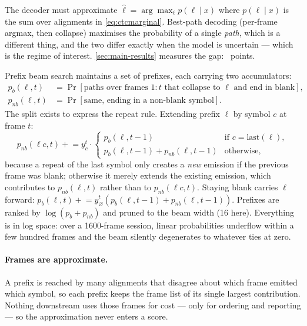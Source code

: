 The decoder must approximate
$\hat\ell = \arg\max_\ell p(\ell\mid x)$ where $p(\ell \mid x)$ is the sum
over alignments in \cref{eq:ctcmarginal}. Best-path decoding (per-frame
argmax, then collapse) maximises the probability of a single \emph{path},
which is a different thing, and the two differ exactly when the model is
uncertain --- which is the regime of interest. \cref{sec:main-results}
measures the gap: \GreedyGap\ points.

Prefix beam search \cite{hannun2014} maintains a set of prefixes, each
carrying two accumulators:
\begin{align}
p_b(\ell, t) &= \Pr[\text{paths over frames } 1{:}t
   \text{ that collapse to } \ell \text{ and end in blank}],\\
p_{nb}(\ell, t) &= \Pr[\text{same, ending in a non-blank symbol}].
\end{align}
The split exists to express the repeat rule. Extending prefix $\ell$ by
symbol $c$ at frame $t$:
\begin{equation}
p_{nb}(\ell c, t) \mathrel{+}= y^t_c \cdot
\begin{cases}
p_b(\ell, t-1) & \text{if } c = \mathrm{last}(\ell),\\
p_b(\ell,t-1) + p_{nb}(\ell,t-1) & \text{otherwise,}
\end{cases}
\label{eq:extend}
\end{equation}
because a repeat of the last symbol only creates a \emph{new} emission if
the previous frame was blank; otherwise it merely extends the existing
emission, which contributes to $p_{nb}(\ell,t)$ rather than to
$p_{nb}(\ell c,t)$. Staying blank carries $\ell$ forward:
$p_b(\ell,t) \mathrel{+}= y^t_\varnothing (p_b(\ell,t-1)+p_{nb}(\ell,t-1))$.
Prefixes are ranked by $\log(p_b+p_{nb})$ and pruned to the beam width (16
here). Everything is in log space: over a 1600-frame session, linear
probabilities underflow within a few hundred frames and the beam silently
degenerates to whatever ties at zero.

\paragraph{Frames are approximate.} A prefix is reached by many alignments
that disagree about which frame emitted which symbol, so each prefix keeps
the frame list of its single largest contribution. Nothing downstream uses
those frames for cost --- only for ordering and reporting --- so the
approximation never enters a score.

